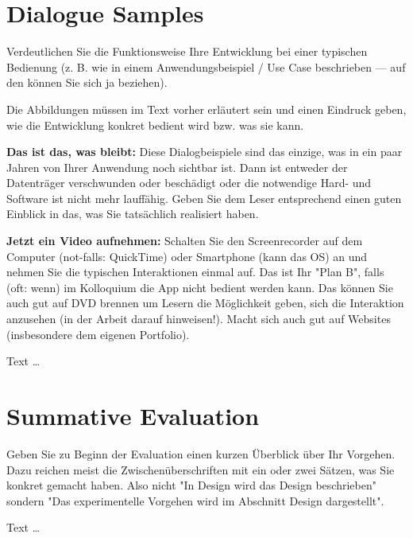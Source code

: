 \documentclass[11pt,a4paper,english]{scrreprt}
\newenvironment{comment}
  {\par\medskip
   \begingroup\color{olive}%
   }
 {\endgroup
  \medskip}
\begin{document}
\chapter{Dialogue Samples}
\begin{comment}
Verdeutlichen Sie die Funktionsweise Ihre Entwicklung bei einer typischen Bedienung (z. B. wie in einem Anwendungsbeispiel / Use Case beschrieben — auf den können Sie sich ja beziehen).

Die Abbildungen müssen im Text vorher erläutert sein und einen Eindruck geben, wie die Entwicklung konkret bedient wird bzw. was sie kann.

\textbf{Das ist das, was bleibt:} Diese Dialogbeispiele sind das einzige, was in ein paar Jahren von Ihrer Anwendung noch sichtbar ist. Dann ist entweder der Datenträger verschwunden oder beschädigt oder die notwendige Hard- und Software ist nicht mehr lauffähig. Geben Sie dem Leser entsprechend einen guten Einblick in das, was Sie tatsächlich realisiert haben.

\textbf{Jetzt ein Video aufnehmen:} Schalten Sie den Screenrecorder auf dem Computer (not-falls: QuickTime) oder Smartphone (kann das OS) an und nehmen Sie die typischen Interaktionen einmal auf. Das ist Ihr "Plan B", falls (oft: wenn) im Kolloquium die App nicht bedient werden kann. Das können Sie auch gut auf DVD brennen um Lesern die Möglichkeit geben, sich die Interaktion anzusehen (in der Arbeit darauf hinweisen!). Macht sich auch gut auf Websites (insbesondere dem eigenen Portfolio).
\end{comment}

Text \dots

\newpage
\chapter{Summative Evaluation}\label{chapter:evaluation}
\begin{comment}
Geben Sie zu Beginn der Evaluation einen kurzen Überblick über Ihr Vorgehen. Dazu reichen meist die Zwischenüberschriften mit ein oder zwei Sätzen, was Sie konkret gemacht haben. Also nicht "In Design wird das Design beschrieben" sondern "Das experimentelle Vorgehen wird im Abschnitt Design dargestellt".
\end{comment}

Text \dots
\end{document}
